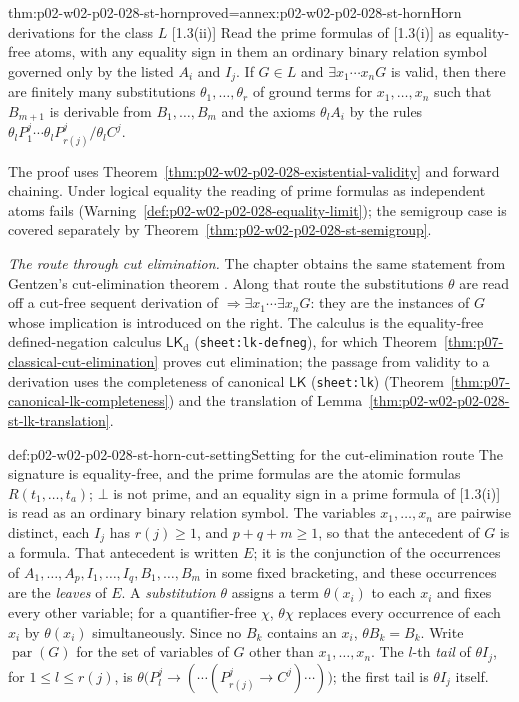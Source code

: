 \begin{hbtheorem}{thm:p02-w02-p02-028-st-horn}{proved=annex:p02-w02-p02-028-st-horn}{Horn derivations for the class \(L\) [1.3(ii)]}
Read the prime formulas of [1.3(i)] as equality-free atoms, with any
equality sign in them an ordinary binary relation symbol governed only by the
listed \(A_i\) and \(I_j\).  If \(G\in L\) and \(\exists x_1\cdots x_nG\) is
valid, then there are finitely many substitutions \(\theta_1,\ldots,\theta_r\)
of ground terms for \(x_1,\ldots,x_n\) such that \(B_{m+1}\) is derivable
from \(B_1,\ldots,B_m\) and the axioms \(\theta_lA_i\) by the rules
\(\theta_lP^j_1\cdots\theta_lP^j_{r(j)}/\theta_lC^j\).
\end{hbtheorem}

The proof uses Theorem~\ref{thm:p02-w02-p02-028-existential-validity} and
forward chaining.  Under logical equality the reading of
prime formulas as independent atoms fails
(Warning~\ref{def:p02-w02-p02-028-equality-limit}); the semigroup case is
covered separately by Theorem~\ref{thm:p02-w02-p02-028-st-semigroup}.

\emph{The route through cut elimination.}  The chapter obtains the same
statement from Gentzen's cut-elimination theorem
\cite[\S1.3(ii), p.~899]{Statman1977}.  Along that route the substitutions
\(\theta\) are read off a cut-free sequent derivation of
\(\Rightarrow\exists x_1\cdots\exists x_nG\): they are the instances of
\(G\) whose implication is introduced on the right.  The calculus is the
equality-free defined-negation calculus
\(\mathsf{LK}_{\mathrm d}\) (\texttt{sheet:lk-defneg}), for which
Theorem~\ref{thm:p07-classical-cut-elimination} proves cut elimination; the
passage from validity to a derivation uses the completeness of canonical
\(\mathsf{LK}\) (\texttt{sheet:lk})
(Theorem~\ref{thm:p07-canonical-lk-completeness}) and the translation of
Lemma~\ref{thm:p02-w02-p02-028-st-lk-translation}.

\begin{hbconvention}{def:p02-w02-p02-028-st-horn-cut-setting}{Setting for the cut-elimination route}
The signature is equality-free, and the prime formulas are the atomic
formulas \(R(t_1,\ldots,t_a)\); \(\bot\) is not prime, and an equality sign
in a prime formula of [1.3(i)] is read as an ordinary binary relation symbol.
The variables \(x_1,\ldots,x_n\) are pairwise distinct, each \(I_j\) has
\(r(j)\geq1\), and \(p+q+m\geq1\), so that the antecedent of \(G\) is a
formula.  That antecedent is written \(E\); it is the conjunction of the
occurrences of \(A_1,\ldots,A_p,I_1,\ldots,I_q,B_1,\ldots,B_m\) in some fixed
bracketing, and these occurrences are the \emph{leaves} of \(E\).
A \emph{substitution} \(\theta\) assigns a term \(\theta(x_i)\) to each
\(x_i\) and fixes every other variable; for a quantifier-free \(\chi\),
\(\theta\chi\) replaces every occurrence of each \(x_i\) by \(\theta(x_i)\)
simultaneously.  Since no \(B_k\) contains an \(x_i\), \(\theta B_k=B_k\).
Write \(\operatorname{par}(G)\) for the set of variables of \(G\) other than
\(x_1,\ldots,x_n\).  The \(l\)-th \emph{tail} of \(\theta I_j\), for
\(1\leq l\leq r(j)\), is
\(\theta\bigl(P^j_l\to(\cdots(P^j_{r(j)}\to C^j)\cdots)\bigr)\); the first
tail is \(\theta I_j\) itself.
\end{hbconvention}


